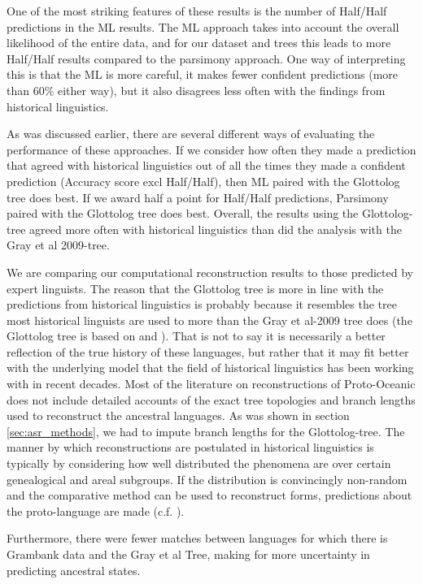 \documentclass[draft,10pt]{article} %
\begin{document}
One of the most striking features of these results is the number of Half/Half predictions in the ML results. The ML approach takes into account the overall likelihood of the entire data, and for our dataset and trees this leads to more Half/Half results compared to the parsimony approach. One way of interpreting this is that the ML is more careful, it makes fewer confident predictions (more than 60\% either way), but it also disagrees less often with the findings from historical linguistics.

As was discussed earlier, there are several different ways of evaluating the performance of these approaches. If we consider how often they made a prediction that agreed with historical linguistics out of all the times they made a confident prediction (Accuracy score excl Half/Half), then ML paired with the Glottolog tree does best. If we award half a point for Half/Half predictions, Parsimony paired with the Glottolog tree does best. Overall, the results using the Glottolog-tree agreed more often with historical linguistics than did the analysis with the Gray et al 2009-tree.

We are comparing our computational reconstruction results to those predicted by expert linguists. The reason that the Glottolog tree is more in line with the predictions from historical linguistics is probably because it resembles the tree most historical linguists are used to more than the Gray et al-2009 tree does (the Glottolog tree is based on \citet{blust_2009,blust_2014} and \citet{blust_chen_2017}). That is not to say it is necessarily a better reflection of the true history of these languages, but rather that it may fit better with the underlying model that the field of historical linguistics has been working with in recent decades. Most of the literature on reconstructions of Proto-Oceanic does not include detailed accounts of the exact tree topologies and branch lengths used to reconstruct the ancestral languages. As was shown in section \ref{sec:asr_methods}, we had to impute branch lengths for the Glottolog-tree. The manner by which reconstructions are postulated in historical linguistics is typically by considering how well distributed the phenomena are over certain genealogical and areal subgroups. If the distribution is convincingly non-random and the comparative method can be used to reconstruct forms, predictions about the proto-language are made (c.f. \citet[109-110]{pawley1973some}).

Furthermore, there were fewer matches between languages for which there is Grambank data and the Gray et al Tree, making for more uncertainty in predicting ancestral states.
\end{document}
